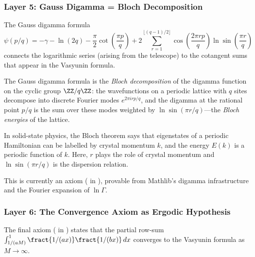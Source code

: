 \subsubsection{Layer 5: Gauss Digamma = Bloch Decomposition}

The Gauss digamma formula
\[
  \psi(p/q) = -\gamma - \ln(2q) - \frac{\pi}{2}\cot\left(\frac{\pi p}{q}\right)
  + 2\sum_{r=1}^{\lfloor(q-1)/2\rfloor} \cos\left(\frac{2\pi rp}{q}\right)
  \ln\sin\left(\frac{\pi r}{q}\right)
\]
connects the logarithmic series (arising from the telescope) to the
cotangent sums that appear in the Vasyunin formula.

\begin{correspondence}
The Gauss digamma formula is the \emph{Bloch decomposition} of the
digamma function on the cyclic group $\ZZ/q\ZZ$: the wavefunctions on
a periodic lattice with $q$ sites decompose into discrete Fourier
modes $e^{2\pi irp/q}$, and the digamma at the rational point $p/q$
is the sum over these modes weighted by $\ln\sin(\pi r/q)$---the
\emph{Bloch energies} of the lattice.

In solid-state physics, the Bloch theorem says that eigenstates of
a periodic Hamiltonian can be labelled by crystal momentum $k$,
and the energy $E(k)$ is a periodic function of $k$. Here,
$r$ plays the role of crystal momentum and $\ln\sin(\pi r/q)$
is the dispersion relation.

This is currently an axiom ( in
), provable from Mathlib's digamma
infrastructure and the Fourier expansion of $\ln\Gamma$.
\end{correspondence}

\subsubsection{Layer 6: The Convergence Axiom as Ergodic Hypothesis}

The final axiom ( in
) states that the partial row-sum
$\int_{1/(aM)}^1 \fract{1/(ax)}\fract{1/(bx)}\,dx$ converges
to the Vasyunin formula as $M \to \infty$.

